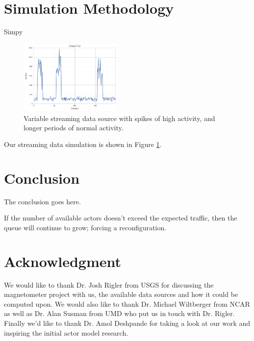 \documentclass[conference,twocolumn,11pt]{IEEEtran}
\begin{document}
\section{Simulation Methodology}

Simpy \cite{matloff_introduction_2008}

\begin{figure}[!h]
    \centering
    \includegraphics[width=0.45\textwidth]{streaming}
    \caption{Variable streaming data source with spikes of high activity, and longer periods of normal activity.}
    \label{fig:streaming}
\end{figure}

Our streaming data simulation is shown in Figure \ref{fig:streaming}.

\section{Conclusion}
The conclusion goes here.

If the number of available actors doesn't exceed the expected traffic, then the queue will continue to grow; forcing a reconfiguration.




\section*{Acknowledgment}
We would like to thank Dr. Josh Rigler from USGS for discussing the magnetometer project with us, the available data sources and how it could be computed upon. We would also like to thank Dr. Michael Wiltberger from NCAR as well as Dr. Alan Susman from UMD who put us in touch with Dr. Rigler. Finally we'd like to thank Dr. Amol Deshpande for taking a look at our work and inspiring the initial actor model research.






\end{document}
